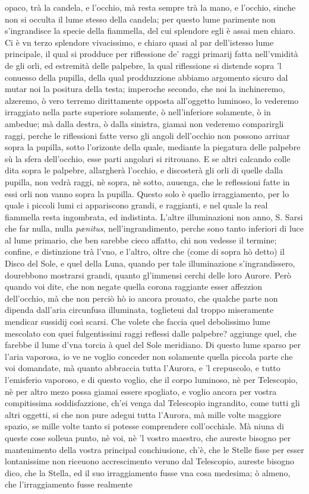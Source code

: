 \documentclass[11pt,twoside,openany]{book}
\begin{document}
opaco, trà la candela, e l'occhio, mà resta sempre trà la mano, e l'occhio, sinche non si occulta il lume stesso della candela; per questo lume parimente non s'ingrandisce la specie della fiammella, del cui splendore egli è assai men chiaro. Ci è vn terzo splendore vivacissimo, e chiaro quasi al par dell'istesso lume principale, il qual si prodduce per riflessione de' raggi primarij fatta nell'vmidità de gli orli, ed estremità delle palpebre, la qual riflessione si distende sopra 'l conuesso della pupilla, della qual prodduzzione abbiamo argomento sicuro dal mutar noi la positura della testa; imperoche secondo, che noi la inchineremo, alzeremo, ò vero terremo dirittamente opposta all'oggetto luminoso, lo vederemo irraggiato nella parte superiore solamente, ò nell'inferiore solamente, ò in ambedue; mà dalla destra, ò dalla sinistra, giamai non vederemo comparirgli raggi, perche le riflessioni fatte verso gli angoli dell'occhio non possono arriuar sopra la pupilla, sotto l'orizonte della quale, mediante la piegatura delle palpebre sù la sfera dell'occhio, esse parti angolari si ritrouano. E se altri calcando colle dita sopra le palpebre, allargherà l'occhio, e discosterà gli orli di quelle dalla pupilla, non vedrà raggi, nè sopra, nè sotto, auuenga, che le reflessioni fatte in essi orli non vanno sopra la pupilla. Questo solo è quello irraggiamento, per lo quale i piccoli lumi ci appariscono grandi, e raggianti, e nel quale la real fiammella resta ingombrata, ed indistinta. L'altre illuminazioni non anno, S. Sarsi che far nulla, nulla \textit{pænitus}, nell'ingrandimento, perche sono tanto inferiori di luce al lume primario, che ben sarebbe cieco affatto, chi non vedesse il termine; confine, e distinzione trà l'vno, e l'altro, oltre che (come di sopra hò detto) il Disco del Sole, e quel della Luna, quando per tale illuminazione s'ingrandissero, dourebbono mostrarsi grandi, quanto gl'immensi cerchi delle loro Aurore. Però quando voi dite, che non negate quella corona raggiante esser affezzion dell'occhio, mà che non perciò hò io ancora prouato, che qualche parte non dipenda dall'aria circunfusa illuminata, toglieteui dal troppo miseramente mendicar sussidij così scarsi. Che volete che faccia quel debolissimo lume mescolato con quei fulgentissimi raggi reflessi dalle palpebre? aggiunge quel, che farebbe il lume d'vna torcia à quel del Sole meridiano. Di questo lume sparso per l'aria vaporosa, io ve ne voglio conceder non solamente quella piccola parte che voi domandate, mà quanto abbraccia tutta l'Aurora, e 'l crepuscolo, e tutto l'emisferio vaporoso, e di questo voglio, che il corpo luminoso, nè per Telescopio, nè per altro mezo possa giamai essere spogliato, e voglio ancora per vostra compitissima soddisfazzione, ch'ei venga dal Telescopio ingrandito, come tutti gli altri oggetti, si che non pure adegui tutta l'Aurora, mà mille volte maggiore spazio, se mille volte tanto si potesse comprendere coll'occhiale. Mà niuna di queste cose solleua punto, nè voi, nè 'l vostro maestro, che aureste bisogno per mantenimento della vostra principal conchiusione, ch'è, che le Stelle fisse per esser lontanissime non riceuono accrescimento veruno dal Telescopio, aureste bisogno dico, che la Stella, ed il suo irraggiamento fusse vna cosa medesima; ò almeno, che l'irraggiamento fusse realmente 
\end{document}
